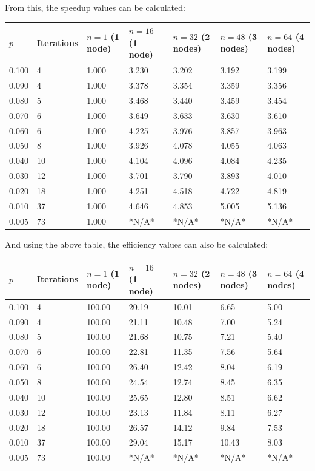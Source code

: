 \documentclass[11pt]{article}
\begin{document}
\begin{appendices}
{\normalsize From this, the speedup values can be calculated:}
\footnotesize{
\begin{center}
\begin{tabular}{|l|l|l|l|l|l|l|}
\hline
$p$ & Iterations & $n=1$ (1 node) & $n=16$ (1 node) & $n=32$ (2 nodes) & $n=48$ (3 nodes) & $n=64$ (4 nodes)\\
\hline
0.100 & 4 & 1.000 & 3.230 & 3.202 & 3.192 & 3.199\\ 
0.090 & 4 & 1.000 & 3.378 & 3.354 & 3.359 & 3.356\\ 
0.080 & 5 & 1.000 & 3.468 & 3.440 & 3.459 & 3.454\\ 
0.070 & 6 & 1.000 & 3.649 & 3.633 & 3.630 & 3.610\\ 
0.060 & 6 & 1.000 & 4.225 & 3.976 & 3.857 & 3.963\\ 
0.050 & 8 & 1.000 & 3.926 & 4.078 & 4.055 & 4.063\\ 
0.040 & 10 & 1.000 & 4.104 & 4.096 & 4.084 & 4.235\\ 
0.030 & 12 & 1.000 & 3.701 & 3.790 & 3.893 & 4.010\\ 
0.020 & 18 & 1.000 & 4.251 & 4.518 & 4.722 & 4.819\\ 
0.010 & 37 & 1.000 & 4.646 & 4.853 & 5.005 & 5.136\\ 
0.005 & 73 & 1.000 & *N/A* & *N/A* & *N/A* & *N/A*\\ 
\hline
\end{tabular}
\end{center}}

{\normalsize And using the above table, the efficiency values can also be calculated:}
\footnotesize{
\begin{center}
\begin{tabular}{|l|l|l|l|l|l|l|}
\hline
$p$ & Iterations & $n=1$ (1 node) & $n=16$ (1 node) & $n=32$ (2 nodes) & $n=48$ (3 nodes) & $n=64$ (4 nodes)\\
\hline
0.100 & 4 & 100.00 & 20.19 & 10.01 & 6.65 & 5.00\\ 
0.090 & 4 & 100.00 & 21.11 & 10.48 & 7.00 & 5.24\\ 
0.080 & 5 & 100.00 & 21.68 & 10.75 & 7.21 & 5.40\\ 
0.070 & 6 & 100.00 & 22.81 & 11.35 & 7.56 & 5.64\\ 
0.060 & 6 & 100.00 & 26.40 & 12.42 & 8.04 & 6.19\\ 
0.050 & 8 & 100.00 & 24.54 & 12.74 & 8.45 & 6.35\\ 
0.040 & 10 & 100.00 & 25.65 & 12.80 & 8.51 & 6.62\\ 
0.030 & 12 & 100.00 & 23.13 & 11.84 & 8.11 & 6.27\\ 
0.020 & 18 & 100.00 & 26.57 & 14.12 & 9.84 & 7.53\\ 
0.010 & 37 & 100.00 & 29.04 & 15.17 & 10.43 & 8.03\\ 
0.005 & 73 & 100.00 & *N/A* & *N/A* & *N/A* & *N/A*\\ 
\hline
\end{tabular}
\end{center}}


\end{appendices}
\end{document}
